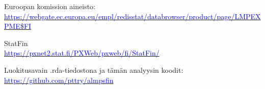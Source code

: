 \documentclass[12pt]{article}
\begin{document}
\vspace{0.5cm}
\noindent Euroopan komission aineisto: \\ \footnotesize \href{https://webgate.ec.europa.eu/empl/redisstat/databrowser/product/page/LMP_EXPME$FI}{\textcolor{blue}{https://webgate.ec.europa.eu/empl/redisstat/databrowser/product/page/LMP\textunderscore EXPME\$FI}} \normalsize

\vspace{0.5cm}
\noindent StatFin \\ \footnotesize\href{https://pxnet2.stat.fi/PXWeb/pxweb/fi/StatFin/}{\textcolor{blue}{https://pxnet2.stat.fi/PXWeb/pxweb/fi/StatFin/}}\normalsize

\vspace{0.5cm}
\noindent Luokitusavain .rda-tiedostona ja tämän analyysin koodit: \\  \footnotesize\href{https://github.com/pttry/almpsfin}{\textcolor{blue}{https://github.com/pttry/almpsfin}}\normalsize
\end{document}
